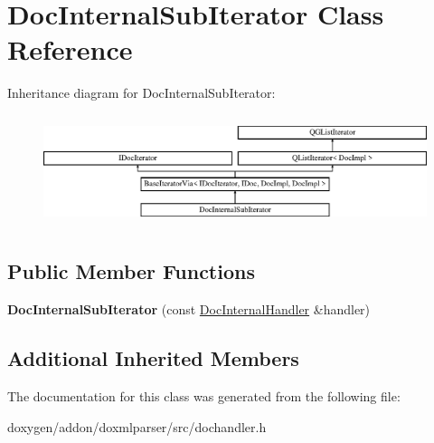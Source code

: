 \hypertarget{class_doc_internal_sub_iterator}{}\section{Doc\+Internal\+Sub\+Iterator Class Reference}
\label{class_doc_internal_sub_iterator}
Inheritance diagram for Doc\+Internal\+Sub\+Iterator\+:\begin{figure}[H]
\begin{center}
\leavevmode
\includegraphics[height=3.294118cm]{class_doc_internal_sub_iterator}
\end{center}
\end{figure}
\subsection*{Public Member Functions}
\begin{DoxyCompactItemize}
\item 
\mbox{\label{class_doc_internal_sub_iterator_a2a7d626ea6c001734a0761fd9f24f088}} 
{\bfseries Doc\+Internal\+Sub\+Iterator} (const \mbox{\hyperlink{class_doc_internal_handler}{Doc\+Internal\+Handler}} \&handler)
\end{DoxyCompactItemize}
\subsection*{Additional Inherited Members}


The documentation for this class was generated from the following file\+:\begin{DoxyCompactItemize}
\item 
doxygen/addon/doxmlparser/src/dochandler.\+h\end{DoxyCompactItemize}
